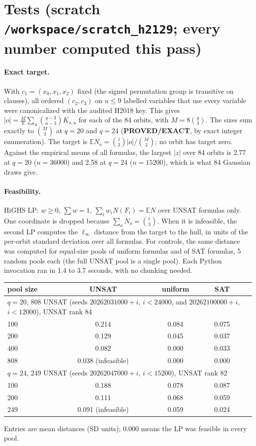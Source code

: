 \documentclass[11pt]{article}
\begin{document}
\section*{Tests (scratch \texttt{/workspace/scratch\_h2129}; every number computed this pass)}
\paragraph{Exact target.} With $c_1=(x_0,x_1,x_2)$ fixed (the signed permutation group is transitive on clauses), all ordered $(c_2,c_3)$ on $u\le 9$ labelled variables that use every variable were canonicalized with the audited H2018 key. This gives $|o|=\tfrac{M}{6}\sum_u\binom{q-3}{u-3}K_{o,u}$ for each of the 84 orbits, with $M=8\binom q3$. The sizes sum exactly to $\binom M3$ at $q=20$ and $q=24$ (\textbf{PROVED/EXACT}, by exact integer enumeration). The target is $\mathbb E N_o=\binom t3|o|/\binom M3$; no orbit has target zero. Against the empirical means of all formulas, the largest $|z|$ over 84 orbits is 2.77 at $q=20$ ($n=36000$) and 2.58 at $q=24$ ($n=15200$), which is what 84 Gaussian draws give.

\paragraph{Feasibility.} HiGHS LP: $w\ge0$, $\sum w=1$, $\sum_i w_iN(F_i)=\mathbb EN$ over UNSAT formulas only. One coordinate is dropped because $\sum_oN_o=\binom t3$. When it is infeasible, the second LP computes the $\ell_\infty$ distance from the target to the hull, in units of the per-orbit standard deviation over all formulas. For controls, the same distance was computed for equal-size pools of uniform formulas and of SAT formulas, 5 random pools each (the full UNSAT pool is a single pool). Each Python invocation ran in 1.4 to 3.7 seconds, with no chunking needed.

\begin{center}\begin{tabular}{lcccc}\toprule
pool size & UNSAT & uniform & SAT & \\\midrule
\multicolumn{5}{l}{$q=20$, 808 UNSAT (seeds $20262031000+i$, $i<24000$, and $20262100000+i$, $i<12000$), UNSAT rank 84}\\
100 & 0.214 & 0.084 & 0.075 &\\
200 & 0.129 & 0.045 & 0.037 &\\
400 & 0.082 & 0.000 & 0.033 &\\
808 & 0.038 (infeasible) & 0.000 & 0.000 &\\\midrule
\multicolumn{5}{l}{$q=24$, 249 UNSAT (seeds $20262047000+i$, $i<15200$), UNSAT rank 82}\\
100 & 0.188 & 0.078 & 0.087 &\\
200 & 0.111 & 0.068 & 0.059 &\\
249 & 0.091 (infeasible) & 0.059 & 0.024 &\\\bottomrule
\end{tabular}\end{center}
Entries are mean distances (SD units); 0.000 means the LP was feasible in every pool.
\end{document}
